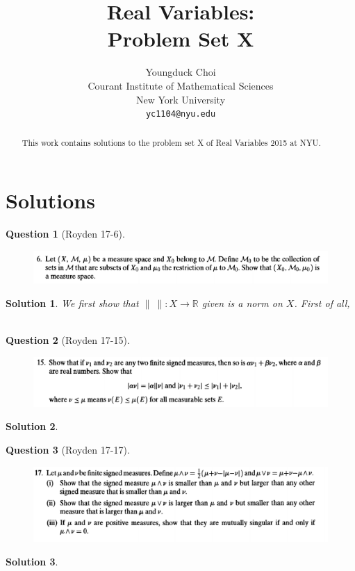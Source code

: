 \documentclass{article} %
\title{Real Variables: \\
Problem Set X}
\author{
Youngduck Choi \\
Courant Institute of Mathematical Sciences \\
New York University \\
\texttt{yc1104@nyu.edu} \\
}
\theoremstyle{quest}
\newtheorem*{question}{Question}
\newtheorem*{solution}{Solution}
\begin{document}
\maketitle

\begin{abstract}
This work contains solutions to the problem set 
X of Real Variables 2015 at NYU.
\end{abstract}

\section{Solutions}

\begin{question}[Royden 17-6]
\hfill
\begin{figure}[h!]
  \centering
    \includegraphics[width=1\textwidth]{rv-17-6.png}
\end{figure}
\end{question}
\begin{solution} We first show that $\lVert \> \rVert:X \to \mathbb{R}$
given is a norm on $X$. First of all, 
\ 
\end{solution}

\newpage

\begin{question}[Royden 17-15]
\hfill
\begin{figure}[h!]
  \centering
    \includegraphics[width=1\textwidth]{rv-17-15.png}
\end{figure}
\end{question}
\begin{solution}
\end{solution}

\newpage

\begin{question}[Royden 17-17]
\hfill
\begin{figure}[h!]
  \centering
    \includegraphics[width=1\textwidth]{rv-17-17.png}
\end{figure}
\end{question}
\begin{solution}
\end{solution}
\end{document}

